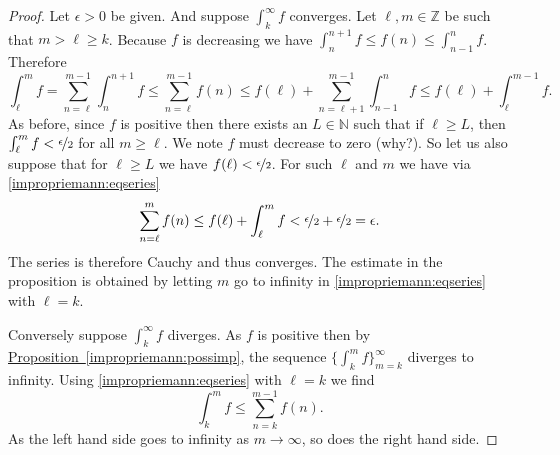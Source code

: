 \documentclass[12pt]{book}
\newcommand{\Z}{{\mathbb{Z}}}
\newcommand{\N}{{\mathbb{N}}}
\theoremstyle{plain}
\theoremstyle{remark}
\theoremstyle{definition}
\theoremstyle{exercise}
\theoremstyle{example}
\newcommand{\propref}[1]{\hyperref[#1]{Proposition~\ref*{#1}}}
\begin{document}
\begin{proof}
Let $\epsilon > 0$ be given.  And suppose $\int_k^\infty f$ converges.
Let $\ell, m \in \Z$ be such that $m > \ell \geq k$.
Because $f$ is decreasing we have
$\int_{n}^{n+1} f \leq f(n) \leq \int_{n-1}^{n} f$.  Therefore
\begin{equation} \label{impropriemann:eqseries}
\int_\ell^m f
=
\sum_{n=\ell}^{m-1} \int_{n}^{n+1} f
\leq
\sum_{n=\ell}^{m-1} f(n)
\leq
f(\ell) +
\sum_{n=\ell+1}^{m-1} \int_{n-1}^{n} f
\leq
f(\ell)+
\int_\ell^{m-1} f .
\end{equation}
As before, since $f$ is positive then there exists
an $L \in \N$ such that if $\ell \geq L$, then
$\int_\ell^{m} f < \nicefrac{\epsilon}{2}$ for all $m \geq \ell$.
We note 
$f$ must decrease to zero (why?).  So let us also suppose
that for $\ell \geq L$ we have $f(\ell) < \nicefrac{\epsilon}{2}$.
For such $\ell$ and $m$ we have via \eqref{impropriemann:eqseries}
\begin{equation*}
\sum_{n=\ell}^{m} f(n)
\leq
f(\ell)+
\int_\ell^{m} f < \nicefrac{\epsilon}{2} + \nicefrac{\epsilon}{2} = \epsilon .
\end{equation*}
The series is therefore Cauchy and thus converges.  The estimate in the
proposition is obtained by letting $m$ go to infinity in
\eqref{impropriemann:eqseries} with $\ell = k$.

Conversely suppose $\int_k^\infty f$ diverges.  
As $f$ is positive then by
\propref{impropriemann:possimp},
the sequence $\{ \int_k^m f \}_{m=k}^\infty$ diverges to infinity.
Using
\eqref{impropriemann:eqseries} with $\ell = k$ we find
\begin{equation*}
\int_k^m f
\leq
\sum_{n=k}^{m-1} f(n) .
\end{equation*}
As the left hand side goes to infinity as $m \to \infty$, so does the right
hand side.
\end{proof}
\end{document}
